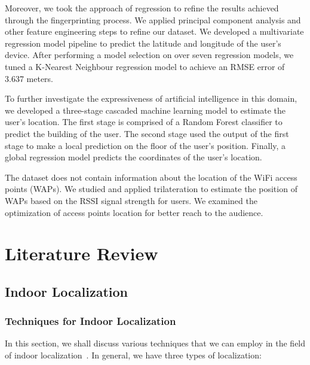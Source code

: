 \documentclass[a4paper,singleside,12pt]{report} %
\begin{document}
			Moreover, we took the approach of regression to refine the results achieved through the fingerprinting process. 
			We applied principal component analysis and other feature engineering steps to refine our dataset. 
			We developed a multivariate regression model pipeline to predict the latitude and longitude of the user's device. 
			After performing a model selection on over seven regression models, we tuned a K-Nearest Neighbour regression model to achieve an RMSE error of 3.637 meters.
			
			To further investigate the expressiveness of artificial intelligence in this domain, we developed a three-stage cascaded machine learning model to estimate the user's location. 
			The first stage is comprised of a Random Forest classifier to predict the building of the user. The second stage used the output of the first stage to make a local prediction on the floor of the user's position. 
			Finally, a global regression model predicts the coordinates of the user's location. 
			
			The dataset does not contain information about the location of the WiFi access points (WAPs). 
			We studied and applied trilateration to estimate the position of WAPs based on the RSSI signal strength for users. 
			We examined the optimization of access points location for better reach to the audience.    

	\chapter{Literature Review}

		\section{Indoor Localization}
			\subsection{Techniques for Indoor Localization}
				In this section, we shall discuss various techniques that we can employ in the field of indoor localization~\cite{zafari2019survey}. In general, we have three types of localization:
				
\end{document}
